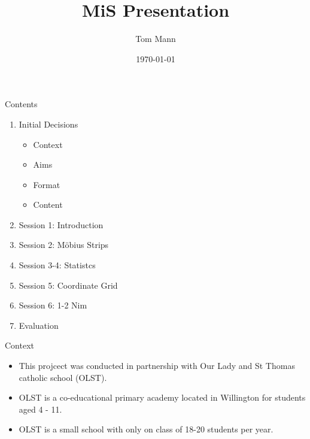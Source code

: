 \documentclass{beamer}  %
\title{MiS Presentation}
\author{Tom Mann}
\date{\today}
\begin{document}
\begin{frame}
    \titlepage
\end{frame}

\begin{frame}{Contents}
    
    
    \begin{enumerate}
        \item Initial Decisions
        \begin{itemize}
            \item Context
            \item Aims
            \item Format
            \item Content
        \end{itemize}
        \item Session 1: Introduction
        \item Session 2: M\"{o}bius Strips
        \item Session 3-4: Statistcs
        \item Session 5: Coordinate Grid
        \item Session 6: 1-2 Nim
        \item Evaluation
    \end{enumerate}
\end{frame}

\begin{frame}{Context}
    \begin{itemize}
        \item This projcect was conducted in partnership with Our Lady and St Thomas catholic school (OLST).
        \item OLST is a co-educational primary academy located in Willington for students aged 4 - 11. 
        \item OLST is a small school with only on class of 18-20 students per year.
    \end{itemize}
\end{frame}
\end{document}
